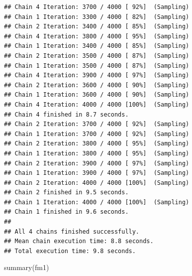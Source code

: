 \documentclass[
]{article}
\newenvironment{Shaded}{\begin{snugshade}}{\end{snugshade}}
\newcommand{\FunctionTok}[1]{\textcolor[rgb]{0.00,0.00,0.00}{#1}}
\newcommand{\NormalTok}[1]{#1}
\begin{document}
\begin{verbatim}
## Chain 4 Iteration: 3700 / 4000 [ 92%]  (Sampling) 
## Chain 1 Iteration: 3300 / 4000 [ 82%]  (Sampling) 
## Chain 2 Iteration: 3400 / 4000 [ 85%]  (Sampling) 
## Chain 4 Iteration: 3800 / 4000 [ 95%]  (Sampling) 
## Chain 1 Iteration: 3400 / 4000 [ 85%]  (Sampling) 
## Chain 2 Iteration: 3500 / 4000 [ 87%]  (Sampling) 
## Chain 1 Iteration: 3500 / 4000 [ 87%]  (Sampling) 
## Chain 4 Iteration: 3900 / 4000 [ 97%]  (Sampling) 
## Chain 2 Iteration: 3600 / 4000 [ 90%]  (Sampling) 
## Chain 1 Iteration: 3600 / 4000 [ 90%]  (Sampling) 
## Chain 4 Iteration: 4000 / 4000 [100%]  (Sampling) 
## Chain 4 finished in 8.7 seconds.
## Chain 2 Iteration: 3700 / 4000 [ 92%]  (Sampling) 
## Chain 1 Iteration: 3700 / 4000 [ 92%]  (Sampling) 
## Chain 2 Iteration: 3800 / 4000 [ 95%]  (Sampling) 
## Chain 1 Iteration: 3800 / 4000 [ 95%]  (Sampling) 
## Chain 2 Iteration: 3900 / 4000 [ 97%]  (Sampling) 
## Chain 1 Iteration: 3900 / 4000 [ 97%]  (Sampling) 
## Chain 2 Iteration: 4000 / 4000 [100%]  (Sampling) 
## Chain 2 finished in 9.5 seconds.
## Chain 1 Iteration: 4000 / 4000 [100%]  (Sampling) 
## Chain 1 finished in 9.6 seconds.
## 
## All 4 chains finished successfully.
## Mean chain execution time: 8.8 seconds.
## Total execution time: 9.8 seconds.
\end{verbatim}

\begin{Shaded}
\begin{Highlighting}[]
\FunctionTok{summary}\NormalTok{(fm1)}
\end{Highlighting}
\end{Shaded}
\end{document}
